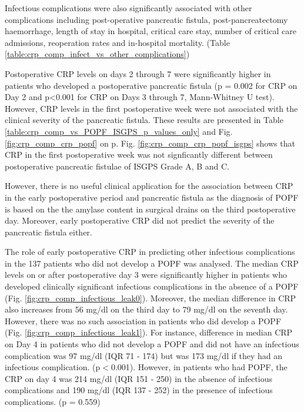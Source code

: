 Infectious complications were also significantly associated with other complications including post-operative pancreatic fistula, post-pancreatectomy haemorrhage, length of stay in hospital, critical care stay, number of critical care admissions, reoperation rates and in-hospital mortality. (Table \ref{table:crp_comp_infect_vs_other_complications})





Postoperative CRP levels on days 2 through 7 were significantly higher in patients who developed a postoperative pancreatic fistula (p = 0.002 for CRP on Day 2 and p<0.001 for CRP on Days 3 through 7, Mann-Whitney U test). 
However, CRP levels in the first postoperative week were not associated with the clinical severity of the pancreatic fistula. These results are presented in Table \ref{table:crp_comp_vs_POPF_ISGPS_p_values_only} and Fig. \ref{fig:crp_comp_crp_popf} on p\pageref{fig:crp_comp_crp_popf}. Fig. \ref{fig:crp_comp_crp_popf_isgps} shows that CRP in the first postoperative week was not signficantly different between postoperative pancreatic fistulae of ISGPS Grade A, B and C. 

However, there is no useful clinical application for the association between CRP in the early postoperative period and  pancreatic fistula as the diagnosis of POPF is based on the the amylase content in surgical drains on the third postoperative day. Moreover, early postoperative CRP did not predict the severity of the pancreatic fistula either.

The role of early postoperative CRP in predicting other infectious complications in the 137 patients who did not develop a POPF was analysed. The median CRP levels on or after postoperative day 3 were significantly higher in patients who developed clinically significant infectious complications in the absence of a POPF (Fig. \ref{fig:crp_comp_infectious_leak0}). Moreover, the median difference in CRP also increases from 56 mg/dl on the third day to 79 mg/dl on the seventh day. However, there was no such association in patients who did develop a POPF (Fig. \ref{fig:crp_comp_infectious_leak1}).  For instance, difference in median CRP on Day 4 in patients who did not develop a POPF and did not have an infectious complication was 97 mg/dl (IQR 71 - 174) but was 173 mg/dl if they had an infectious complication. (p$<$0.001). However, in patients who had POPF, the CRP on day 4 was 214 mg/dl (IQR 151 - 250) in the absence of infectious complications and 190 mg/dl (IQR 137 - 252) in the presence of infectious complications. (p = 0.559)

